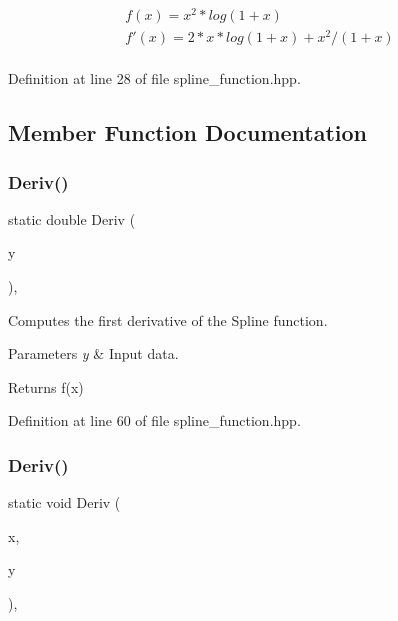 \begin{eqnarray*} f(x) = x^2 * log(1 + x) \\ f'(x) = 2 * x * log(1 + x) + x^2 / (1 + x)\\ \end{eqnarray*} 

Definition at line 28 of file spline\+\_\+function.\+hpp.



\subsection{Member Function Documentation}
\mbox{\label{classmlpack_1_1ann_1_1SplineFunction_a163d34fd09f8edf457164f5033c635cf}} 
\subsubsection{Deriv()\hspace{0.1cm}{\footnotesize\ttfamily [1/2]}}
{\footnotesize\ttfamily static double Deriv (\begin{DoxyParamCaption}\item[{const double}]{y }\end{DoxyParamCaption})\hspace{0.3cm}{\ttfamily [inline]}, {\ttfamily [static]}}



Computes the first derivative of the Spline function. 


\begin{DoxyParams}{Parameters}
{\em y} & Input data. \\
\hline
\end{DoxyParams}
\begin{DoxyReturn}{Returns}
f\textquotesingle{}(x) 
\end{DoxyReturn}


Definition at line 60 of file spline\+\_\+function.\+hpp.

\mbox{\label{classmlpack_1_1ann_1_1SplineFunction_a0ad035ec996acd7025807d0e9e082887}} 
\subsubsection{Deriv()\hspace{0.1cm}{\footnotesize\ttfamily [2/2]}}
{\footnotesize\ttfamily static void Deriv (\begin{DoxyParamCaption}\item[{const Input\+Vec\+Type \&}]{x,  }\item[{Output\+Vec\+Type \&}]{y }\end{DoxyParamCaption})\hspace{0.3cm}{\ttfamily [inline]}, {\ttfamily [static]}}



